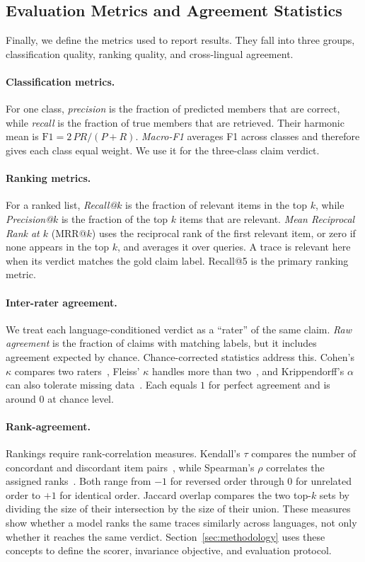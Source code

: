 \subsection{Evaluation Metrics and Agreement Statistics}
\label{subsec:bg-metrics}

Finally, we define the metrics used to report results. They fall into three groups, classification
quality, ranking quality, and cross-lingual agreement.

\paragraph{Classification metrics.}
For one class, \emph{precision} is the fraction of predicted members that are correct, while
\emph{recall} is the fraction of true members that are retrieved. Their harmonic mean is
$\mathrm{F1} = 2\,PR/(P+R)$. \emph{Macro-F1} averages F1 across classes and therefore gives each
class equal weight. We use it for the three-class claim verdict.

\paragraph{Ranking metrics.}
For a ranked list, \emph{Recall@$k$} is the fraction of relevant items in the top $k$, while
\emph{Precision@$k$} is the fraction of the top $k$ items that are relevant. \emph{Mean Reciprocal
Rank at $k$} (MRR@$k$) uses the reciprocal rank of the first relevant item, or zero if none appears in
the top $k$, and averages it over queries. A trace is relevant here when its verdict matches the gold
claim label. Recall@5 is the primary ranking metric.

\paragraph{Inter-rater agreement.}
We treat each language-conditioned verdict as a ``rater'' of the same claim. \emph{Raw agreement} is
the fraction of claims with matching labels, but it includes agreement expected by chance.
Chance-corrected statistics address this. Cohen's $\kappa$ compares two
raters~\cite{cohen1960coefficient}, Fleiss' $\kappa$ handles more than
two~\cite{fleiss1971measuring}, and Krippendorff's $\alpha$ can also tolerate missing
data~\cite{krippendorff2004content}. Each equals $1$ for perfect agreement and is around $0$ at chance
level.

\paragraph{Rank-agreement.}
Rankings require rank-correlation measures. Kendall's $\tau$ compares the number of concordant and
discordant item pairs~\cite{kendall1938new}, while Spearman's $\rho$ correlates the assigned
ranks~\cite{spearman1904proof}. Both range from $-1$ for reversed order through $0$ for unrelated
order to $+1$ for identical order. Jaccard overlap compares the two top-$k$ sets by dividing the size
of their intersection by the size of their union. These measures show whether a model ranks the same
traces similarly across languages, not only whether it reaches the same verdict.
Section~\ref{sec:methodology} uses these concepts to define the scorer, invariance objective, and
evaluation protocol.

